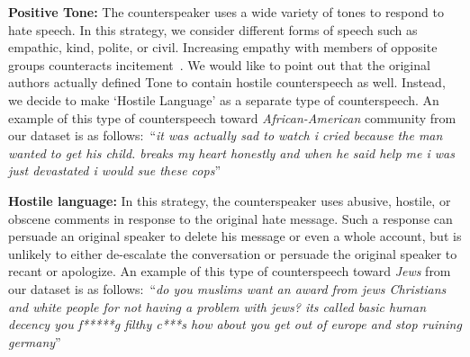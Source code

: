 \documentclass[11pt,a4paper]{article}
\newcommand{\TODO}[1]{\textcolor{red}{#1}}
\newcommand{\binny}[1]{\textcolor{blue}{[Binny: #1]}}
\begin{document}
{\noindent\textbf{Positive Tone:}
The counterspeaker uses a wide variety of tones to respond to hate speech. In this strategy, we consider different forms of speech such as empathic, kind, polite, or civil. Increasing empathy with members of opposite groups counteracts
incitement~\cite{benesch2014countering}. We would like to point out that the original authors actually defined Tone to contain hostile counterspeech as well. Instead, we decide to make `Hostile Language' as a separate type of counterspeech. An example of this type of counterspeech toward {\sl African-American} community from our dataset is as follows:~\textquotedblleft \textit{it was actually sad to watch i cried because the man wanted to get his child.  breaks my heart honestly and when he said  help me i was just devastated i would sue these cops}\textquotedblright

\noindent\textbf{Hostile language:}
In this strategy, the counterspeaker uses abusive, hostile, or obscene comments in response to the original hate message. Such a response can persuade an original speaker to delete his message or even a whole account, but is unlikely to either de-escalate the conversation or persuade the original speaker to recant or apologize. An example of this type of counterspeech toward {\sl Jews} from our dataset is as follows:~\textquotedblleft \textit{do you muslims want an award from jews Christians and white people for not having a problem with jews? its called basic human decency you f*****g filthy c***s how about you get out of europe and stop ruining germany}\textquotedblright

\iffalse \TODO{PG: we are using names here!!, also language..}\binny{Done.}

\TODO{PG: Earlier, you mentioned that you had 2 new classes to account for the dataset, what are those?}\binny{We removed one of the categories: 'Opinion'. Initially, we put those comments in this category which were talking about their opinion. While tagging, we realized that this was very ambiguous. We have the data tagged but we dropped in from the paper. The second category was the 'Hostile Language'. I have modified the earlier lines now.}\fi






}
\end{document}
